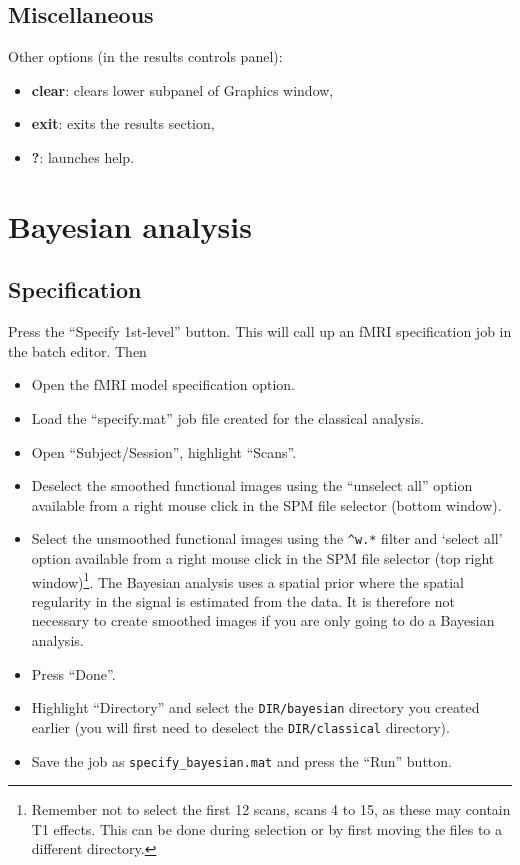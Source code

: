 \subsection{Miscellaneous}

Other options (in the results controls panel):

\begin{itemize}
\item \textbf{clear}: clears lower subpanel of Graphics window,
\item \textbf{exit}: exits the results section,
\item \textbf{?}: launches help.
\end{itemize}

\section{Bayesian analysis}

\subsection{Specification}

Press the ``Specify 1st-level'' button. This will call up an fMRI specification job in the batch editor. Then

\begin{itemize}
\item Open the fMRI model specification option.
\item Load the ``specify.mat'' job file created for the classical analysis.
\item Open ``Subject/Session'', highlight ``Scans''.
\item Deselect the smoothed functional images using the ``unselect all'' option available from a right mouse click in the SPM file selector (bottom window).
\item Select the unsmoothed functional images using the \texttt{\textasciicircum w.*} filter and `select all' option available from a right mouse click in the SPM file selector (top right window)\footnote{Remember not to select the first 12 scans, scans 4 to 15, as these may contain T1 effects. This can be done during selection or by first moving the files to a different directory.}. The Bayesian analysis uses a spatial prior where the spatial regularity in the signal is estimated from the data. It is therefore not necessary to create smoothed images if you are only going to do a Bayesian analysis.
\item Press ``Done''.
\item Highlight ``Directory'' and select the \texttt{DIR/bayesian} directory you created earlier (you will first need to deselect the \texttt{DIR/classical} directory).
\item Save the job as \texttt{specify\_bayesian.mat} and press the ``Run'' button.
\end{itemize}

